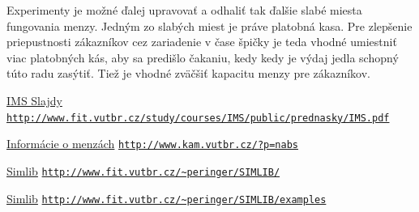 \documentclass{article}
\begin{document}
Experimenty je možné ďalej upravovať a odhaliť tak ďalšie slabé miesta fungovania menzy. Jedným zo slabých miest je práve platobná kasa. Pre zlepšenie priepustnosti zákazníkov cez zariadenie v čase špičky je teda vhodné umiestniť viac platobných kás, aby sa predišlo čakaniu, kedy kedy je výdaj jedla schopný túto radu zasýtiť. Tiež je vhodné zväčšiť kapacitu menzy pre zákazníkov.

\pagebreak

  \begin{thebibliography}{1}

  \href{http://www.fit.vutbr.cz/study/courses/IMS/public/prednasky/IMS.pdf}{IMS Slajdy} \newline
  \href{http://www.fit.vutbr.cz/study/courses/IMS/public/prednasky/IMS.pdf}{\nolinkurl{http://www.fit.vutbr.cz/study/courses/IMS/public/prednasky/IMS.pdf}}
  
  \href{http://www.kam.vutbr.cz/?p=nabs}{Informácie o menzách} \newline
  \href{http://www.kam.vutbr.cz/?p=nabs}{\nolinkurl{http://www.kam.vutbr.cz/?p=nabs}}
  
  \href{http://www.fit.vutbr.cz/~peringer/SIMLIB/}{Simlib} \newline
  \href{http://www.fit.vutbr.cz/~peringer/SIMLIB/}{\nolinkurl{http://www.fit.vutbr.cz/~peringer/SIMLIB/}}
  
  \href{http://www.fit.vutbr.cz/~peringer/SIMLIB/examples/}{Simlib} \newline
  \href{http://www.fit.vutbr.cz/~peringer/SIMLIB/examples/}{\nolinkurl{http://www.fit.vutbr.cz/~peringer/SIMLIB/examples}}

  \end{thebibliography}
\end{document}
